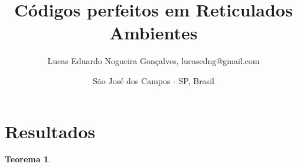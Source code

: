\documentclass{article}
\title{Códigos perfeitos em Reticulados Ambientes}
\author{Lucas Eduardo Nogueira Gonçalves, lucasedng@gmail.com}
\date{São José dos Campos - SP, Brasil}
\theoremstyle{plain}
\newtheorem{theorem}{Teorema}
\theoremstyle{definition}
\theoremstyle{remark}
\begin{document}
\maketitle

\section{Resultados}

    \begin{theorem}
    
    \end{theorem}
    
    
\end{document}
